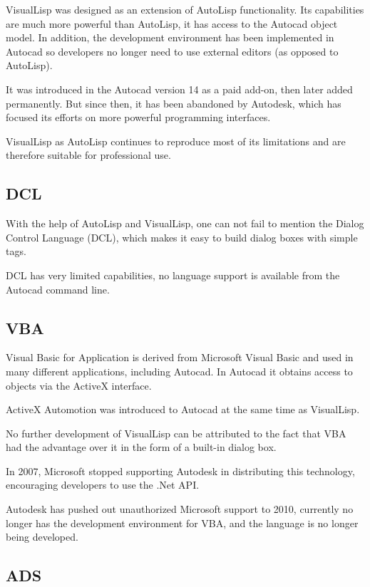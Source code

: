 \documentclass[a4paper, 11pt, article]{report}
\begin{document}
VisualLisp was designed as an extension of AutoLisp functionality. Its capabilities are much more powerful than AutoLisp, it has access to the Autocad object model. In addition, the development environment has been implemented in Autocad so developers no longer need to use external editors (as opposed to AutoLisp).

It was introduced in the Autocad version 14 as a paid add-on, then later added permanently. But since then, it has been abandoned by Autodesk, which has focused its efforts on more powerful programming interfaces.

VisualLisp as AutoLisp continues to reproduce most of its limitations and are therefore suitable for professional use.

\subsection{DCL}
   
With the help of AutoLisp and VisualLisp, one can not fail to mention the Dialog Control Language (DCL), which makes it easy to build dialog boxes with simple tags.

DCL has very limited capabilities, no language support is available from the Autocad command line.

\subsection{VBA}

Visual Basic for Application is derived from Microsoft Visual Basic and used in many different applications, including Autocad. In Autocad it obtains access to objects via the ActiveX interface.

ActiveX Automotion was introduced to Autocad at the same time as VisualLisp.

No further development of VisualLisp can be attributed to the fact that VBA had the advantage over it in the form of a built-in dialog box.

In 2007, Microsoft stopped supporting Autodesk in distributing this technology, encouraging developers to use the .Net API.

Autodesk has pushed out unauthorized Microsoft support to 2010, currently no longer has the development environment for VBA, and the language is no longer being developed.

\subsection{ADS}
\end{document}
